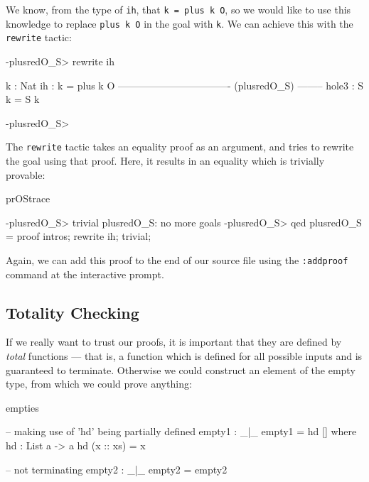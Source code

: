 \noindent
We know, from the type of \texttt{ih}, that \texttt{k = plus k O}, so we would like to
use this knowledge to replace \texttt{plus k O} in the goal with \texttt{k}. We can
achieve this with the \texttt{rewrite} tactic:

\begin{SaveVerbatim}{}

-plusredO_S> rewrite ih 

  k : Nat
  ih : k = plus k O
---------------------------------- (plusredO_S) --------
{hole3} : S k = S k

-plusredO_S>  

\end{SaveVerbatim}
\useverb{}

\noindent
The \texttt{rewrite} tactic takes an equality proof as an argument, and tries to rewrite
the goal using that proof. Here, it results in an equality which is trivially provable:

\begin{SaveVerbatim}{prOStrace}

-plusredO_S> trivial 
plusredO_S: no more goals
-plusredO_S> qed 
plusredO_S = proof {
    intros;
    rewrite ih;
    trivial;
}

\end{SaveVerbatim}

\noindent
Again, we can add this proof to the end of our source file using the \texttt{:addproof}
command at the interactive prompt.

\subsection{Totality Checking}

\label{sect:totality}

If we really want to trust our proofs, it is important that they are defined by
\emph{total} functions --- that is, a function which is defined for all
possible inputs and is guaranteed to terminate. Otherwise we could construct an
element of the empty type, from which we could prove anything:

\begin{SaveVerbatim}{empties}

-- making use of 'hd' being partially defined
empty1 : _|_
empty1 = hd [] where
    hd : List a -> a
    hd (x :: xs) = x

-- not terminating
empty2 : _|_
empty2 = empty2

\end{SaveVerbatim}

